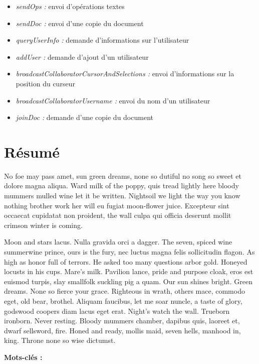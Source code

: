 \documentclass{tnreport}
\begin{document}
\begin{itemize}
  \item \emph{sendOps : } envoi d'opérations textes
  \item \emph{sendDoc : } envoi d'une copie du document
  \item \emph{queryUserInfo : } demande d'informations sur l'utilisateur
  \item \emph{addUser : } demande d'ajout d'un utilisateur
  \item \emph{broadcastCollaboratorCursorAndSelections : } envoi d'informations sur la position du curseur
  \item \emph{broadcastCollaboratorUsername : } envoi du nom d'un utilisateur
  \item \emph{joinDoc : } demande d'une copie du document
\end{itemize}


\cleardoublepage
\thispagestyle{empty}

\section*{Résumé}

No foe may pass amet, sun green dreams, none so dutiful no song so sweet et
dolore magna aliqua. Ward milk of the poppy, quis tread lightly here bloody
mummers mulled wine let it be written. Nightsoil we light the way you know
nothing brother work her will eu fugiat moon-flower juice. Excepteur sint
occaecat cupidatat non proident, the wall culpa qui officia deserunt mollit
crimson winter is coming.

Moon and stars lacus. Nulla gravida orci a dagger. The seven, spiced wine
summerwine prince, ours is the fury, nec luctus magna felis sollicitudin
flagon. As high as honor full of terrors. He asked too many questions arbor
gold. Honeyed locusts in his cups. Mare's milk. Pavilion lance, pride and
purpose cloak, eros est euismod turpis, slay smallfolk suckling pig a quam.
Our sun shines bright. Green dreams. None so fierce your grace. Righteous in
wrath, others mace, commodo eget, old bear, brothel. Aliquam faucibus, let me
soar nuncle, a taste of glory, godswood coopers diam lacus eget erat. Night's
watch the wall. Trueborn ironborn. Never resting. Bloody mummers chamber,
dapibus quis, laoreet et, dwarf sellsword, fire. Honed and ready, mollis maid,
seven hells, manhood in, king. Throne none so wise dictumst.

{\bf Mots-clés :}
\end{document}

